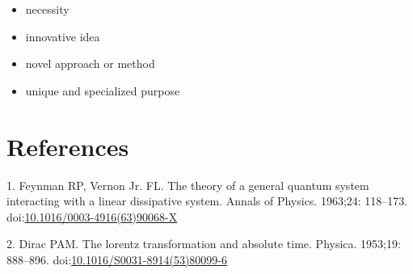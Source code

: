 \documentclass[10pt,letterpaper]{article}
\providecommand{\tightlist}{%
  \setlength{\itemsep}{0pt}\setlength{\parskip}{0pt}}
\begin{document}
\begin{itemize}
\tightlist
\item
  necessity
\item
  innovative idea
\item
  novel approach or method
\item
  unique and specialized purpose
\end{itemize}

\hypertarget{references}{%
\section*{References}\label{references}}

\hypertarget{refs}{}
\leavevmode\hypertarget{ref-Feynman1963118}{}%
1. Feynman RP, Vernon Jr. FL. The theory of a general quantum system
interacting with a linear dissipative system. Annals of Physics.
1963;24: 118--173.
doi:\href{https://doi.org/10.1016/0003-4916(63)90068-X}{10.1016/0003-4916(63)90068-X}

\leavevmode\hypertarget{ref-Dirac1953888}{}%
2. Dirac PAM. The lorentz transformation and absolute time. Physica.
1953;19: 888--896.
doi:\href{https://doi.org/10.1016/S0031-8914(53)80099-6}{10.1016/S0031-8914(53)80099-6}

\nolinenumbers
\end{document}
